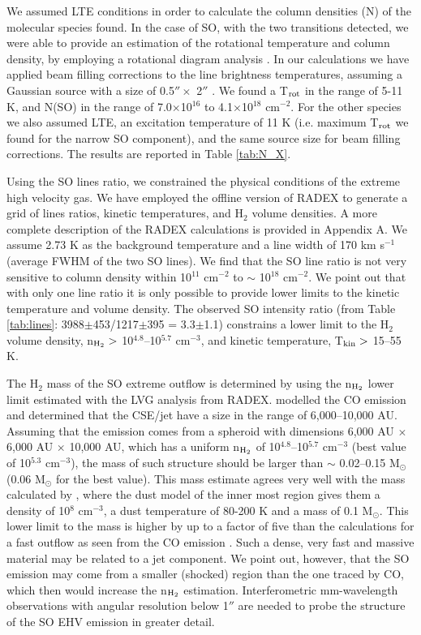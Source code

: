 \documentclass[a4paper,fleqn,usenatbib]{mnras}
\begin{document}
We assumed LTE conditions in order to calculate the column densities (N) of the molecular species found. In the case of SO, with the two transitions detected, we were able to provide an estimation of the rotational temperature and column density, by employing a rotational diagram analysis \citep[following][]{Claude2000}. In our calculations we have applied beam filling corrections to the line brightness temperatures, assuming a Gaussian source with a size of 0.5$''\times$ 2$''$ \citep[e.g.,][]{Imai12}. We found a T$_{\rm rot}$ in the range of 5-11 K, and N(SO) in the range of 7.0$\times$10$^{16}$ to 4.1$\times$10$^{18}$ cm$^{-2}$. For the other species we also assumed LTE, an excitation temperature of 11 K (i.e. maximum T$_{\rm rot}$ we found for the narrow SO component), and the same source size for beam filling corrections. The results are reported in Table \ref{tab:N_X}.    

Using the SO lines ratio, we constrained the physical conditions of the extreme high velocity gas. We have employed the offline version of RADEX \citep{Tak07} to generate a grid of lines ratios, kinetic temperatures, and H$_2$ volume densities. A more complete description of the RADEX calculations is provided in Appendix A. We assume 2.73 K as the background temperature and a line width of 170 km s$^{-1}$ (average FWHM of the two SO lines). We find that the SO line ratio is not very sensitive to column density within 10$^{11}$ cm$^{-2}$ to $\sim$ 10$^{18}$ cm$^{-2}$. We point out that with only one line ratio it is only possible to provide lower limits to the kinetic temperature and volume density. The observed SO intensity ratio (from Table \ref{tab:lines}: 3988$\pm$453/1217$\pm$395 = 3.3$\pm$1.1) constrains a lower limit to the H$_2$ volume density, n$_{\rm H_2} >$ 10$^{4.8}$--10$^{5.7}$ cm$^{-3}$, and kinetic temperature, T$_{\rm kin} >$ 15--55 K. 

The H$_2$ mass of the SO extreme outflow is determined by using the n$_{\rm H_2}$ lower limit estimated with the LVG analysis from RADEX. \citet{Imai12} modelled the CO emission and determined that the CSE/jet have a size in the range of 6,000--10,000 AU. Assuming that the emission comes from a spheroid with dimensions 6,000 AU $\times$ 6,000 AU $\times$ 10,000 AU, which has a uniform n$_{\rm H_2}$ of 10$^{4.8}$--10$^{5.7}$ cm$^{-3}$ (best value of 10$^{5.3}$ cm$^{-3}$), the mass of such structure should be larger than $\sim$ 0.02--0.15 M$_{\odot}$ (0.06 M$_{\odot}$ for the best value). This mass estimate agrees very well with the mass calculated by \citet[see table 4.]{zijlstra01}, where the dust model of the inner most region gives them a density of 10$^{8}$ cm$^{-3}$, a dust temperature of 80-200 K and a mass of 0.1 M$_{\odot}$. This lower limit to the mass is higher by up to a factor of five than the calculations for a fast outflow as seen from the CO emission \citep[see, e.g.,][]{Sahai06}. Such a dense, very fast and massive material may be related to a jet component. We point out, however, that the SO emission may come from a smaller (shocked) region than the one traced by CO, which then would increase the n$_{\rm H_2}$ estimation. Interferometric mm-wavelength observations with angular resolution below 1$''$ are needed to probe the structure of the SO EHV emission in greater detail.  
\end{document}
